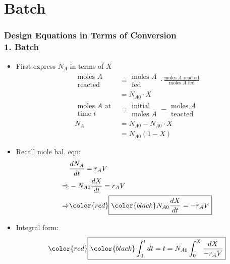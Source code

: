 \section{Batch}
\begin{frame}\frametitle{Design Equations in Terms of Conversion\\{1. \color{blue}Batch}}
	\begin{itemize}
		\item	First express $N_A$ in terms of $X$
		\begin{align*}
			\begin{array}{c}
				\text{moles } A \\
				\text{reacted}
			\end{array}
			&=
			\begin{array}{c}
				\text{moles }A\\
				\text{fed}
			\end{array}
			\cdot\frac{\text{moles }A\text{ reacted}}{\text{moles }A\text{ fed}}\\
			&= N_{A0}\cdot X\\
			\begin{array}{c}
				\text{moles }A\text{ at}\\
				\text{time }t
			\end{array}
			&=
			\begin{array}{c}
				\text{initial}\\
				\text{moles }A
			\end{array}
			-
			\begin{array}{c}
				\text{moles }A\\
				\text{teacted}
			\end{array}
			\\
			N_A &= N_{A0} - N_{A0}\cdot X \\
			&= N_{A0}(1 - X)
		\end{align*}
	\end{itemize}
\end{frame}

\begin{frame}
	\begin{itemize}
		\item	Recall mole bal. eqn:
		\begin{align*}
			&\frac{dN_A}{dt} = r_AV\\
			\Rightarrow&-N_{A0}\frac{dX}{dt} = r_AV\\
			\Rightarrow&{\color{red}\boxed{\color{black}N_{A0}\frac{dX}{dt} = -r_AV}}\\
		\end{align*}
		\item	Integral form: $${\color{red}\boxed{\color{black}\int_0^tdt = t = N_{A0}\int_0^X\frac{dX}{-r_AV}}}$$
	\end{itemize}
\end{frame}

